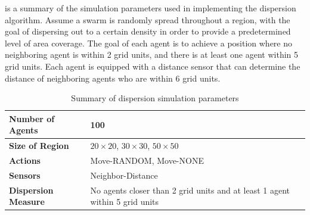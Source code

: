 
 is a summary of the simulation parameters used in implementing the dispersion algorithm.  Assume a swarm is randomly spread throughout a region, with the goal of dispersing out to a certain density in order to provide a predetermined level of area coverage.  The goal of each agent is to achieve a position where no neighboring agent is within 2 grid units, and there is at least one agent within 5 grid units.  Each agent is equipped with a distance sensor that can determine the distance of neighboring agents who are within 6 grid units.  

\begin{table}[ht]
\begin{center}
  \begin{tabular}{|l|p{6cm}|}
    \hline
    \textbf{Number of Agents} & 100 \\
    \hline
    \textbf{Size of Region} & $20\times20$, $30\times30$, $50\times50$ \\
    \hline
    \textbf{Actions} & Move-RANDOM, Move-NONE \\
    \hline
    \textbf{Sensors} & Neighbor-Distance \\
    \hline
    \textbf{Dispersion Measure} & No agents closer than 2 grid units and at least 1 agent within 5 grid units \\
    \hline
  \end{tabular}
  \caption{Summary of dispersion simulation parameters}
  \label{tab:SweepDispersionParameters}
\end{center}
\end{table}

